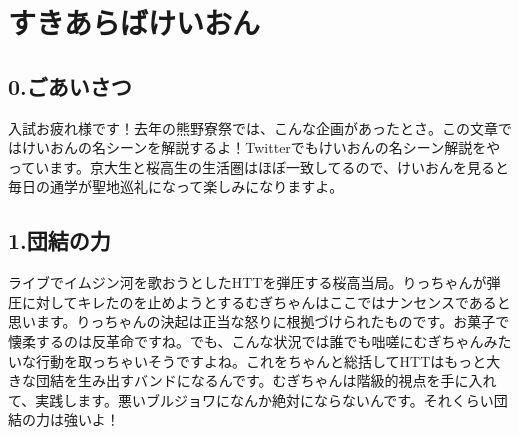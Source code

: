 \subsecnomaru

\section{すきあらばけいおん}
\label{sec:suki_kon}


\subsection{0.ごあいさつ}


入試お疲れ様です！去年の熊野寮祭では、こんな企画があったとさ。この文章ではけいおんの名シーンを解説するよ！Twitterでもけいおんの名シーン解説をやっています。京大生と桜高生の生活圏はほぼ一致してるので、けいおんを見ると毎日の通学が聖地巡礼になって楽しみになりますよ。

\subsection{1.団結の力}

\begin{quote}
\end{quote}

ライブでイムジン河を歌おうとしたHTTを弾圧する桜高当局。りっちゃんが弾圧に対してキレたのを止めようとするむぎちゃんはここではナンセンスであると思います。りっちゃんの決起は正当な怒りに根拠づけられたものです。お菓子で懐柔するのは反革命ですね。でも、こんな状況では誰でも咄嗟にむぎちゃんみたいな行動を取っちゃいそうですよね。これをちゃんと総括してHTTはもっと大きな団結を生み出すバンドになるんです。むぎちゃんは階級的視点を手に入れて、実践します。悪いブルジョワになんか絶対にならないんです。それくらい団結の力は強いよ！

